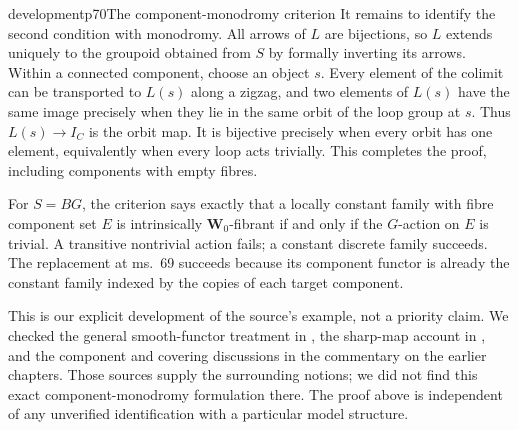 \begin{dcomment}{development}{p70}{The component-monodromy criterion}
It remains to identify the second condition with monodromy. All arrows of $L$ are bijections, so $L$ extends uniquely to the groupoid obtained from $S$ by formally inverting its arrows. Within a connected component, choose an object $s$. Every element of the colimit can be transported to $L(s)$ along a zigzag, and two elements of $L(s)$ have the same image precisely when they lie in the same orbit of the loop group at $s$. Thus $L(s)\to I_C$ is the orbit map. It is bijective precisely when every orbit has one element, equivalently when every loop acts trivially. This completes the proof, including components with empty fibres.

For $S=BG$, the criterion says exactly that a locally constant family with fibre component set $E$ is intrinsically $\mathbf W_0$-fibrant if and only if the $G$-action on $E$ is trivial. A transitive nontrivial action fails; a constant discrete family succeeds. The replacement at ms.~69 succeeds because its component functor is already the constant family indexed by the copies of each target component.

This is our explicit development of the source's example, not a priority claim. We checked the general smooth-functor treatment in \citet[Theorem~1.2]{Maltsiniotis2005Asphericite}, the sharp-map account in \citet[Section~2]{Rezk1998Sharp}, and the component and covering discussions in the commentary on the earlier chapters. Those sources supply the surrounding notions; we did not find this exact component-monodromy formulation there. The proof above is independent of any unverified identification with a particular model structure.
\end{dcomment}



